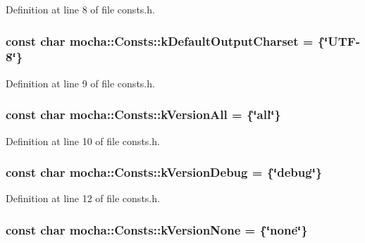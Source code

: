 Definition at line 8 of file consts.h.

\hypertarget{classmocha_1_1_consts_a0073c52f88a33a14d03d69f4e90c1d84}{
\subsubsection[{kDefaultOutputCharset}]{\setlength{\rightskip}{0pt plus 5cm}const char {\bf mocha::Consts::kDefaultOutputCharset} = \{\char`\"{}UTF-\/8\char`\"{}\}}}
\label{classmocha_1_1_consts_a0073c52f88a33a14d03d69f4e90c1d84}


Definition at line 9 of file consts.h.

\hypertarget{classmocha_1_1_consts_a581360da31f08228079ee5bc671c31b7}{
\subsubsection[{kVersionAll}]{\setlength{\rightskip}{0pt plus 5cm}const char {\bf mocha::Consts::kVersionAll} = \{\char`\"{}all\char`\"{}\}}}
\label{classmocha_1_1_consts_a581360da31f08228079ee5bc671c31b7}


Definition at line 10 of file consts.h.

\hypertarget{classmocha_1_1_consts_a15e1b0a8794aa22fd12fe11b68e0f27f}{
\subsubsection[{kVersionDebug}]{\setlength{\rightskip}{0pt plus 5cm}const char {\bf mocha::Consts::kVersionDebug} = \{\char`\"{}debug\char`\"{}\}}}
\label{classmocha_1_1_consts_a15e1b0a8794aa22fd12fe11b68e0f27f}


Definition at line 12 of file consts.h.

\hypertarget{classmocha_1_1_consts_a55c2c7c73ea9ace1cd3d4bf4d49c624b}{
\subsubsection[{kVersionNone}]{\setlength{\rightskip}{0pt plus 5cm}const char {\bf mocha::Consts::kVersionNone} = \{\char`\"{}none\char`\"{}\}}}
\label{classmocha_1_1_consts_a55c2c7c73ea9ace1cd3d4bf4d49c624b}


